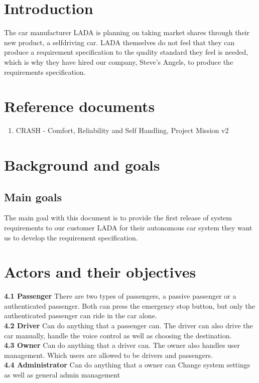 \documentclass{article}
\begin{document}
\newpage

\tableofcontents

\newpage

\section{Introduction}
The car manufacturer LADA is planning on taking market shares through their new product, a selfdriving car. LADA themselves do not feel that they can produce a requirement specification to the quality standard they feel is needed, which is why they have hired our company, Steve's Angels, to produce the requirements specification. 

\section{Reference documents} %
\begin{enumerate}
\item CRASH - Comfort, Reliability and Self Handling, Project Mission v2
\end{enumerate}

\section{Background and goals}
\subsection{Main goals}
The main goal with this document is to provide the first release of system requirements to our customer LADA for their autonomous car system they want us to develop the requirement specification. 


\section{Actors and their objectives}



\textbf{4.1 Passenger} There are two types of passengers, a passive passenger or a authenticated passenger. Both can press the emergency stop button, but only the authenticated passenger can ride in the car alone.\\
\textbf{4.2 Driver} Can do anything that a passenger can.
The driver can also drive the car manually, handle the voice control as well as choosing the destination. \\
\textbf{4.3 Owner} Can do anything that a driver can. The owner also handles user management. Which users are allowed to be drivers and passengers. \\
\textbf{4.4 Administrator} Can do anything that a owner can
Change system settings as well as general admin management \\
\end{document}
